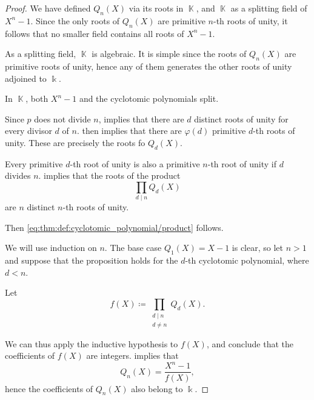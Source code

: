 \begin{proof}
   We have defined \( Q_n(X) \) via its roots in \( \BbbK \), and \( \BbbK \) as a splitting field of \( X^n - 1 \). Since the only roots of \( Q_n(X) \) are primitive \( n \)-th roots of unity, it follows that no smaller field contains all roots of \( X^n - 1 \).

   As a splitting field, \( \BbbK \) is algebraic. It is simple since the roots of \( Q_n(X) \) are primitive roots of unity, hence any of them generates the other roots of unity adjoined to \( \Bbbk \).

   In \( \BbbK \), both \( X^n - 1 \) and the cyclotomic polynomials split.

  Since \( p \) does not divide \( n \),  implies that there are \( d \) distinct roots of unity for every divisor \( d \) of \( n \).  then implies that there are \( \varphi(d) \) primitive \( d \)-th roots of unity. These are precisely the roots fo \( Q_d(X) \).

  Every primitive \( d \)-th root of unity is also a primitive \( n \)-th root of unity if \( d \) divides \( n \).  implies that the roots of the product
  \begin{equation*}
    \prod_{d \mid n} Q_d(X)
  \end{equation*}
  are \( n \) distinct \( n \)-th roots of unity.

  Then \eqref{eq:thm:def:cyclotomic_polynomial/product} follows.

   We will use induction on \( n \). The base case \( Q_1(X) = X - 1 \) is clear, so let \( n > 1 \) and suppose that the proposition holds for the \( d \)-th cyclotomic polynomial, where \( d < n \).

  Let
  \begin{equation}\label{eq:thm:def:cyclotomic_polynomial/coefficients/proof/step}
    f(X) \coloneqq \prod_{\substack{d \mid n \\ d \neq n}} Q_d(X).
  \end{equation}

  We can thus apply the inductive hypothesis to \( f(X) \), and conclude that the coefficients of \( f(X) \) are integers.  implies that
  \begin{equation*}
    Q_n(X) = \frac {X^n - 1} {f(X)},
  \end{equation*}
  hence the coefficients of \( Q_n(X) \) also belong to \( \Bbbk \).


\end{proof}
